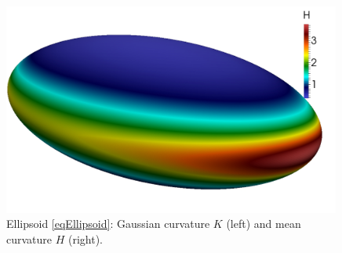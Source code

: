 \begin{description}
\begin{figure}
\begin{minipage}[htp]{.23\textwidth}
      \includegraphics[width=0.99\textwidth]{bilder/ellipsoid/H.jpg}
    \end{minipage}
    \caption{Ellipsoid \eqref{eqEllipsoid}: Gaussian curvature \( K \) (left) and mean curvature \( H \) (right).}
    \label{figEllipsoid}
  \end{figure}
       


\end{description}
